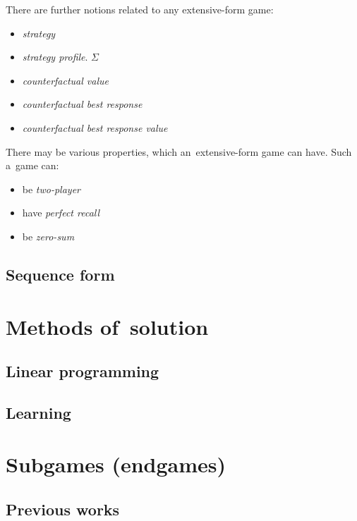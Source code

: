There are further notions related to any extensive-form game:

\begin{itemize}
  \item \emph{strategy}
  \item \emph{strategy profile}. $\Sigma$
  \item \emph{counterfactual value}
  \item \emph{counterfactual best response}
  \item \emph{counterfactual best response value}
\end{itemize}

There may be various properties, which an~extensive-form game can have.
Such a~game can:

\begin{itemize}
  \item be \emph{two-player}
  \item have \emph{perfect recall}
  \item be \emph{zero-sum}
\end{itemize}

\subsection{Sequence form}

\section{Methods of~solution}

\subsection{Linear programming}

\subsection{Learning}

\section{Subgames (endgames)}

\subsection{Previous works}
